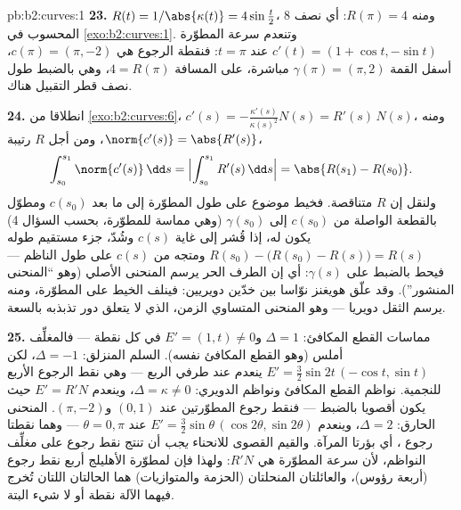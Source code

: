 \begin{solution}{pb:b2:curves:1}
\textbf{23.} $R(t) = 1/\abs{\kappa(t)} = 4\sin\tfrac t2$، ومنه $R(\pi) = 4$: أي نصف  $8$ المحسوب
في \cref{exo:b2:curves:1}. وتنعدم سرعة المطوّرة $c'(t) = (1 +
\cos t, -\sin t)$ عند $t = \pi$: فنقطة الرجوع هي
$c(\pi)
= (\pi, -2)$، أسفل القمة $\gamma(\pi) = (\pi,
2)$ مباشرة، على المسافة $4 = R(\pi)$، وهي بالضبط
طول نصف قطر التقبيل هناك.

\textbf{24.} انطلاقا من \cref{exo:b2:curves:6}، $c'(s) =
-\frac{\kappa'(s)}{\kappa(s)^2}N(s) = R'(s)\,N(s)$، ومنه $\norm{c'(s)} = \abs{R'(s)}$، ومن أجل
$R$ رتيبة،
\[
\int_{s_0}^{s_1}\norm{c'(s)}\,\dd s =
\Bigl|\int_{s_0}^{s_1}R'(s)\,\dd s\Bigr| = \abs{R(s_1) -
R(s_0)} .
\]
ولنقل إن $R$ متناقصة. فخيط موضوع على طول المطوّرة إلى ما بعد
$c(s_0)$ ومطوّل بالقطعة الواصلة من $c(s_0)$ إلى $\gamma(s_0)$ (وهي مماسة
للمطوّرة، بحسب السؤال 4) يكون له، إذا قُشر إلى غاية $c(s)$ وشُدّ،
جزء مستقيم طوله $R(s_0) - \bigl(R(s_0) - R(s)\bigr) = R(s)$ ومتجه من $c(s)$ على طول الناظم --- فيحط
بالضبط على $\gamma(s)$: أي إن الطرف الحر يرسم المنحنى الأصلي (وهو
``المنحنى المنشور''). وقد علّق هويغنز نوّاسا بين خدّين دويريين:
فينلف الخيط على المطوّرة، ومنه يرسم الثقل دويريا --- وهو المنحنى
المتساوي الزمن، الذي لا يتعلق دور تذبذبه بالسعة.

\textbf{25.} مماسات القطع المكافئ: $\Delta = 1$ و$E' =
(1, t) \neq 0$ في كل نقطة ---
فالمغلِّف أملس (وهو القطع المكافئ نفسه). السلم المنزلق: $\Delta = -1$، لكن
$E' =
\tfrac32\sin 2t\,(-\cos t, \sin t)$ ينعدم عند طرفي الربع --- وهي نقط الرجوع الأربع للنجمية.
نواظم القطع المكافئ ونواظم الدويري: $\Delta = \kappa \neq 0$، وينعدم $E' = R'N$ حيث يكون
 أقصويا بالضبط --- فنقط رجوع المطوّرتين عند $(0,1)$ و$(\pi, -2)$.
المنحنى الحارق: $\Delta = 2$، وينعدم $E' = \tfrac32\sin\theta\,(\cos2\theta,
\sin2\theta)$ عند $\theta = 0, \pi$ --- وهما نقطتا
رجوع ، أي بؤرتا المرآة. والقيم القصوى للانحناء \emph{يجب} أن
تنتج نقط رجوع على مغلِّف النواظم، لأن سرعة المطوّرة هي $R'N$: ولهذا
فإن لمطوّرة الأهليلج أربع نقط رجوع (أربعة رؤوس)، والعائلتان
المنحلتان (الحزمة والمتوازيات) هما الحالتان اللتان تُخرج فيهما
الآلة نقطة أو لا شيء البتة.
\end{solution}
